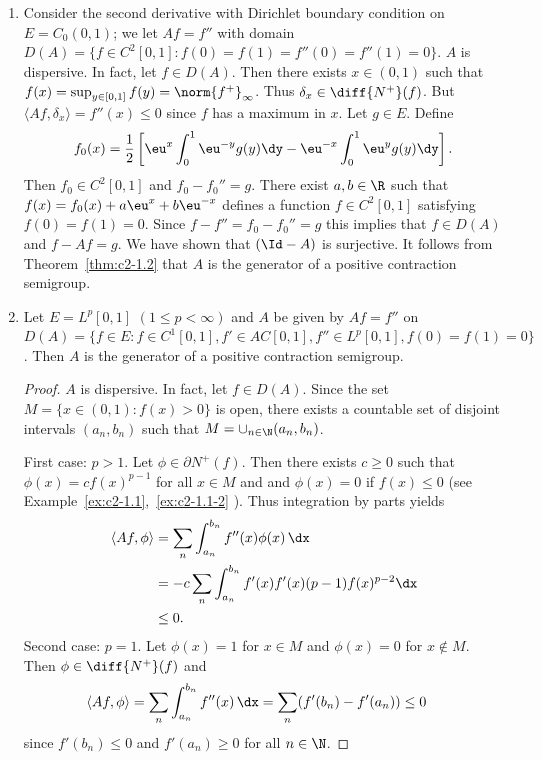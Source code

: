 \begin{examples}\label{ex:c2-1.5}
%
\begin{enumerate}[\upshape (i), wide, labelindent=.25em] %
\item \label{ex:c2-1.5-1}
Consider the second derivative with Dirichlet boundary condition on $E = C_{0}(0,1)$; \ie we let $Af = f''$ with domain $D(A) = \{f \in C^{2}[0,1] \colon f(0) = f(1) = f''(0) = f''(1) = 0\}$.
$A$ is dispersive. 
In fact, let $f \in D(A)$. 
Then there exists $x \in (0,1)$ such that $f(x) = \sup_{y \in [0,1]} f(y) = \norm{f^{+}}_{\infty}$. 
Thus $\delta_{x} \in \diff{N^{+}}(f)$. 
But $\langle Af,\delta_{x} \rangle = f''(x) \leq 0$ since $f$ has a maximum in $x$.
Let $g \in E$. 
Define 
\[
f_{0}(x) = \frac{1}{2} \left[\eu^{x} \int_{0}^{1} \eu^{-y}g(y) \dy - \eu^{-x} \int_{0}^{1} \eu^{y}g(y) \dy \right].
\]
Then $f_{0} \in C^{2}[0,1]$ and $f_{0} - f_{0}'' = g$. 
There exist $a, b \in \R$ such that $f(x) = f_{0}(x) + a\eu^{x} + b\eu^{-x}$ defines a function $f \in C^{2}[0,1]$ satisfying $f(0) = f(1) = 0$. Since $f - f'' = f_{0} - f_{0}'' = g$ this implies that $f \in D(A)$ and $f - Af = g$. We have shown that $(\Id - A)$ is surjective. It follows from 
Theorem~\ref{thm:c2-1.2} that $A$ is the generator of a positive contraction semigroup.
\item \label{ex:c2-1.5-2}
Let $E = L^{p}[0,1]$ $(1 \leq p < \infty)$ and $A$ be given by $Af = f''$ on $D(A) = \{f \in E \colon f \in C^{1}[0,1], f' \in AC[0,1], f'' \in L^{p}[0,1], f(0) = f(1) = 0\}$. 
Then $A$ is the generator of a positive contraction semigroup.
\begin{proof}
$A$ is dispersive. 
In fact, let $f \in D(A)$. 
Since the set $M = \{x \in (0,1) \colon f(x) > 0\}$ is open, there exists a countable set of disjoint intervals $(a_{n},b_{n})$ such that $M = \cup_{n \in \N} (a_{n},b_{n})$.

First case: $p > 1$.
Let $\phi \in \partial N^{+}(f)$. 
Then there exists $c \geq 0$ such that $\phi(x) = c f(x)^{p-1}$ for all $x \in M$ and and $\phi(x) = 0$ if\/ $f(x) \leq 0$ (see Example~\ref{ex:c2-1.1},~\ref{ex:c2-1.1-2} ). 
Thus integration by parts yields
\begin{align*}
\langle Af,\phi \rangle &= \sum_{n} \int_{a_{n}}^{b_{n}} f''(x)\phi(x) \, \dx \\
&= -c \sum_{n} \int_{a_{n}}^{b_{n}} f'(x)f'(x) (p-1)f(x)^{p-2}  \dx \\
&\leq 0.
\end{align*}
Second case: $p = 1$.
Let $\phi(x) = 1$ for $x \in M$ and $\phi(x) = 0$ for $x \not\in M$. 
Then $\phi \in \diff{N^{+}}(f)$ and
\begin{align*}
\langle Af,\phi \rangle &= \sum_{n} \int_{a_{n}}^{b_{n}} f''(x) \, \dx = \sum_{n} (f'(b_{n}) - f'(a_{n})) \leq 0
\end{align*}
since $f'(b_{n}) \leq 0$ and $f'(a_{n}) \geq 0$ for all $n \in \N$.


\end{proof}
\end{enumerate}
\end{examples}
